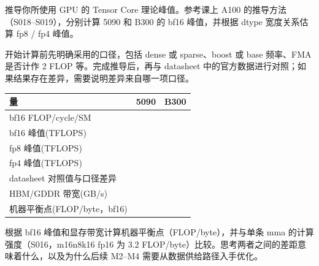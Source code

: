 \documentclass[11pt,a4paper,fontset=fandol]{ctexart}
\begin{document}

推导你所使用 GPU 的 Tensor Core 理论峰值。参考课上 A100
的推导方法（S018--S019），分别计算 5090 和 B300 的 bf16 峰值，并根据
dtype 宽度关系估算 fp8 / fp4 峰值。

开始计算前先明确采用的口径，包括 dense 或 sparse、boost 或 base
频率、FMA 是否计作 2 FLOP 等。完成推导后，再与 datasheet
中的官方数据进行对照；如果结果存在差异，需要说明差异来自哪一项口径。

\begin{longtable}[]{@{}lll@{}}
\toprule\noalign{}
量 & 5090 & B300 \\
\midrule\noalign{}
\endhead
\bottomrule\noalign{}
\endlastfoot
bf16 FLOP/cycle/SM & & \\
bf16 峰值(TFLOPS) & & \\
fp8 峰值(TFLOPS) & & \\
fp4 峰值(TFLOPS) & & \\
datasheet 对照值与口径差异 & & \\
HBM/GDDR 带宽(GB/s) & & \\
机器平衡点(FLOP/byte，bf16) & & \\
\end{longtable}

根据 bf16 峰值和显存带宽计算机器平衡点（FLOP/byte），并与单条 mma
的计算强度（S016，m16n8k16 fp16 为 3.2
FLOP/byte）比较。思考两者之间的差距意味着什么，以及为什么后续 M2--M4
需要从数据供给路径入手优化。
\end{document}
